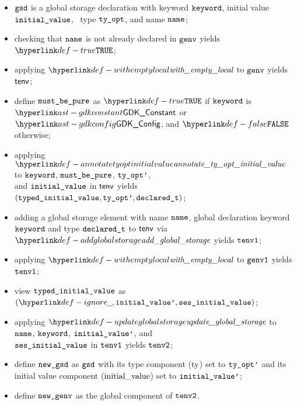 \ProseParagraph
\AllApply
\begin{itemize}
  \item $\texttt{gsd}$ is a global storage declaration with keyword $\texttt{keyword}$, initial value \\ $\texttt{initial\_value}$,
        \optional\ type $\texttt{ty\_opt}$, and name $\texttt{name}$;
  \item checking that $\texttt{name}$ is not already declared in $\texttt{genv}$ yields $\True$\ProseOrTypeError;
  \item applying $\withemptylocal$ to $\texttt{genv}$ yields $\textsf{tenv}$;
  \item define $\texttt{must\_be\_pure}$ as $\True$ if $\texttt{keyword}$ is $\GDKConstant$ or $\GDKConfig$, and $\False$ otherwise;
  \item applying $\annotatetyoptinitialvalue$ to $\texttt{keyword}$, $\texttt{must\_be\_pure}$, $\texttt{ty\_opt'}$, \\
        and $\texttt{initial\_value}$ in $\textsf{tenv}$ yields\\
        $(\texttt{typed\_initial\_value}, \texttt{ty\_opt'}, \texttt{declared\_t})$\ProseOrTypeError;
  \item adding a global storage element with name $\texttt{name}$, global declaration keyword \\ $\texttt{keyword}$ and type $\texttt{declared\_t}$
        to $\textsf{tenv}$ via $\addglobalstorage$ yields $\texttt{tenv1}$\ProseOrTypeError;
  \item applying $\withemptylocal$ to $\texttt{genv1}$ yields $\texttt{tenv1}$;
  \item view $\texttt{typed\_initial\_value}$ as $(\Ignore, \initialvaluep, \vsesinitialvalue)$;
  \item applying $\updateglobalstorage$ to $\texttt{name}$, $\texttt{keyword}$, $\texttt{initial\_value'}$, and \\
        $\texttt{ses\_initial\_value}$ in $\texttt{tenv1}$ yields $\texttt{tenv2}$\ProseOrTypeError;
  \item define $\texttt{new\_gsd}$ as $\texttt{gsd}$ with its type component ($\text{ty}$) set to $\texttt{ty\_opt'}$ and its initial value component
        ($\text{initial\_value}$) set to $\texttt{initial\_value'}$;
  \item define $\texttt{new\_genv}$ as the global component of $\texttt{tenv2}$.
\end{itemize}

